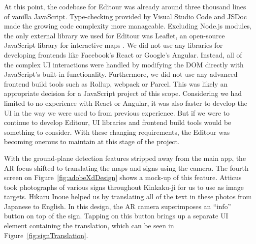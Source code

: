 \documentclass[a4paper, 10pt, american, titlepage]{article}
\begin{document}
At this point, the codebase for Editour was already around three thousand lines
of vanilla JavaScript. Type-checking provided by Visual Studio Code and JSDoc
made the growing code complexity more manageable. Excluding Node.js modules,
the only external library we used for Editour was Leaflet, an open-source
JavaScript library for interactive maps \autocite{leafletjs}. We did not use
any libraries for developing frontends like Facebook's React or Google's
Angular. Instead, all of the complex UI interactions were handled by modifying
the DOM directly with JavaScript's built-in functionality. Furthermore, we did
not use any advanced frontend build tools such as Rollup, webpack or Parcel.
This was likely an appropriate decision for a JavaScript project of this scope.
Considering we had limited to no experience with React or Angular, it was also
faster to develop the UI in the way we were used to from previous experience.
But if we were to continue to develop Editour, UI libraries and frontend build
tools would be something to consider. With these changing requirements, the
Editour was becoming onerous to maintain at this stage of the project.

With the ground-plane detection features stripped away from the main app, the
AR focus shifted to translating the maps and signs using the camera. The fourth
screen on Figure~\ref{fig:adobeXdDesign} shows a mock-up of this feature.
Atticus took photographs of various signs throughout Kinkaku-ji for us to use as
image targets. Hikaru Inoue helped us by translating all of the text in these
photos from Japanese to English. In this design, the AR camera superimposes an
``info'' button on top of the sign. Tapping on this button brings up a separate
UI element containing the translation, which can be seen in
Figure~\ref{fig:signTranslation}.
\end{document}
